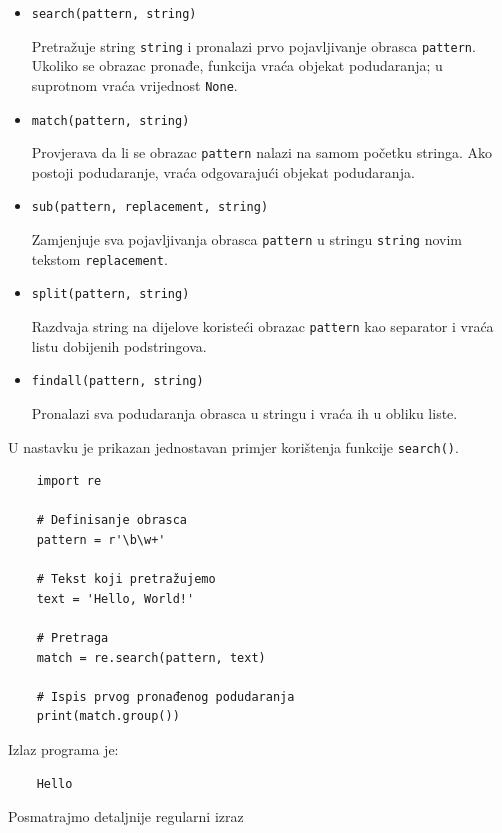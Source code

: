 \begin{itemize}
	
	\item \texttt{search(pattern, string)}
	
	Pretražuje string \texttt{string} i pronalazi prvo pojavljivanje obrasca \texttt{pattern}. Ukoliko se obrazac pronađe, funkcija vraća objekat podudaranja; u suprotnom vraća vrijednost \texttt{None}.
	
	\item \texttt{match(pattern, string)}
	
	Provjerava da li se obrazac \texttt{pattern} nalazi na samom početku stringa. Ako postoji podudaranje, vraća odgovarajući objekat podudaranja.
	
	\item \texttt{sub(pattern, replacement, string)}
	
	Zamjenjuje sva pojavljivanja obrasca \texttt{pattern} u stringu \texttt{string} novim tekstom \texttt{replacement}.
	
	\item \texttt{split(pattern, string)}
	
	Razdvaja string na dijelove koristeći obrazac \texttt{pattern} kao separator i vraća listu dobijenih podstringova.
	
	\item \texttt{findall(pattern, string)}
	
	Pronalazi sva podudaranja obrasca u stringu i vraća ih u obliku liste.
	
\end{itemize}

U nastavku je prikazan jednostavan primjer korištenja funkcije \texttt{search()}.

\begin{verbatim}
	import re
	
	# Definisanje obrasca
	pattern = r'\b\w+'
	
	# Tekst koji pretražujemo
	text = 'Hello, World!'
	
	# Pretraga
	match = re.search(pattern, text)
	
	# Ispis prvog pronađenog podudaranja
	print(match.group())
\end{verbatim}

Izlaz programa je:

\begin{verbatim}
	Hello
\end{verbatim}

Posmatrajmo detaljnije regularni izraz

